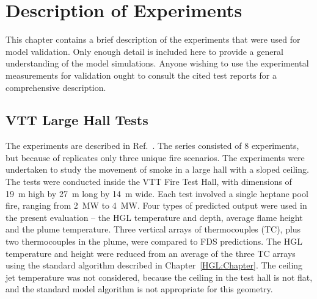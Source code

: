 \chapter{Description of Experiments}

\label{Experiments_Chapter}

This chapter contains a brief description of the experiments that were used for model validation. Only enough detail is included here to provide a
general understanding of the model simulations. Anyone wishing to use the experimental measurements for validation ought to consult the cited test reports for a
comprehensive description.



\section{VTT Large Hall Tests}

The experiments are described in Ref.~\cite{Hostikka:VTT2104}. The series consisted of 8 experiments, but because of replicates only three unique fire
scenarios. The experiments were undertaken to study the movement of smoke in a large hall with a sloped ceiling. The tests were conducted inside the
VTT Fire Test Hall, with dimensions of 19~m high by 27~m long by 14~m wide. Each test involved a single heptane pool fire, ranging from 2~MW to 4~MW.
Four types of predicted output were used in the present evaluation -- the HGL temperature and depth, average flame height and the plume
temperature. Three vertical arrays of thermocouples (TC), plus two thermocouples in the plume, were compared to FDS predictions. The HGL
temperature and height were reduced from an average of the three TC
arrays using the standard algorithm described in
Chapter~\ref{HGL:Chapter}. The ceiling jet temperature was not
considered, because the ceiling in the test hall is not flat, and the
standard model algorithm is not appropriate for this geometry.

